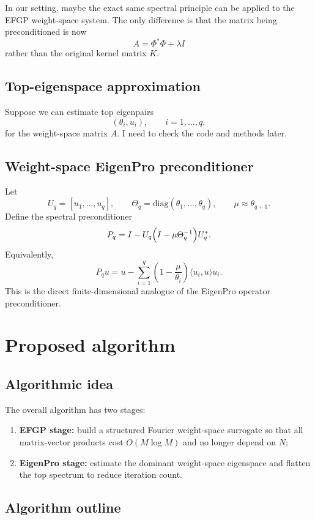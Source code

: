 \documentclass{article}
\begin{document}
In our setting, maybe the exact same spectral principle can be applied to the EFGP weight-space system. The only difference is that the matrix being preconditioned is now
\[
A=\Phi^*\Phi+\lambda I
\]
rather than the original kernel matrix \(K\).


\subsection{Top-eigenspace approximation}
Suppose we can estimate top eigenpairs
\[
(\theta_i,u_i),\qquad i=1,\dots,q,
\]
for the weight-space matrix \(A\). I need to check the code and methods later.

\subsection{Weight-space EigenPro preconditioner}

Let
\[
U_q=[u_1,\dots,u_q],\qquad
\Theta_q=\mathrm{diag}(\theta_1,\dots,\theta_q),
\qquad
\mu\approx \theta_{q+1}.
\]
Define the spectral preconditioner
\[
P_q
=
I-U_q\Bigl(I-\mu \Theta_q^{-1}\Bigr)U_q^*.
\]
Equivalently,
\[
P_q u
=
u-\sum_{i=1}^q \left(1-\frac{\mu}{\theta_i}\right)\langle u_i,u\rangle u_i.
\]
This is the direct finite-dimensional analogue of the EigenPro operator preconditioner.

\section{Proposed algorithm}

\subsection{Algorithmic idea}

The overall algorithm has two stages:
\begin{enumerate}
    \item \textbf{EFGP stage:} build a structured Fourier weight-space surrogate so that all matrix-vector products cost \(O(M\log M)\) and no longer depend on \(N\);
    \item \textbf{EigenPro stage:} estimate the dominant weight-space eigenspace and flatten the top spectrum to reduce iteration count.
\end{enumerate}

\subsection{Algorithm outline}
\end{document}
